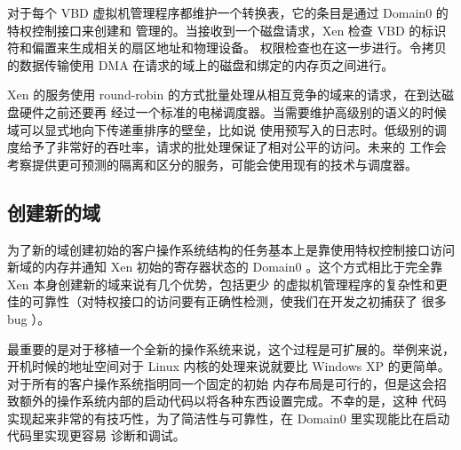 对于每个 VBD 虚拟机管理程序都维护一个转换表，它的条目是通过 Domain0 的特权控制接口来创建和
管理的。当接收到一个磁盘请求，Xen 检查 VBD 的标识符和偏置来生成相关的扇区地址和物理设备。
权限检查也在这一步进行。令拷贝的数据传输使用 DMA 在请求的域上的磁盘和绑定的内存页之间进行。

Xen 的服务使用 round-robin 的方式批量处理从相互竞争的域来的请求，在到达磁盘硬件之前还要再
经过一个标准的电梯调度器。当需要维护高级别的语义的时候域可以显式地向下传递重排序的壁垒，比如说
使用预写入的日志时。低级别的调度给予了非常好的吞吐率，请求的批处理保证了相对公平的访问。未来的
工作会考察提供更可预测的隔离和区分的服务，可能会使用现有的技术与调度器。

\subsection{创建新的域}

为了新的域创建初始的客户操作系统结构的任务基本上是靠使用特权控制接口访问新域的内存并通知 Xen
初始的寄存器状态的 Domain0 。这个方式相比于完全靠 Xen 本身创建新的域来说有几个优势，包括更少
的虚拟机管理程序的复杂性和更佳的可靠性（对特权接口的访问要有正确性检测，使我们在开发之初捕获了
很多 bug ）。

最重要的是对于移植一个全新的操作系统来说，这个过程是可扩展的。举例来说，开机时候的地址空间对于
Linux 内核的处理来说就要比 Windows XP 的更简单。对于所有的客户操作系统指明同一个固定的初始
内存布局是可行的，但是这会招致额外的操作系统内部的启动代码以将各种东西设置完成。不幸的是，这种
代码实现起来非常的有技巧性，为了简洁性与可靠性，在 Domain0 里实现能比在启动代码里实现更容易
诊断和调试。
